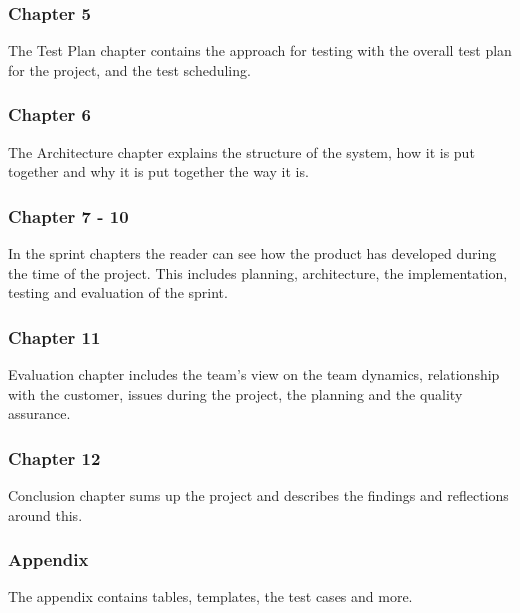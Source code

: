 \subsubsection{Chapter 5}
The Test Plan chapter contains the approach for testing with the overall test plan for the project, and the test scheduling.
\subsubsection{Chapter 6}
The Architecture chapter explains the structure of the system, how it is put together and why it is put together the way it is.
\subsubsection{Chapter 7 - 10}
In the sprint chapters the reader can see how the product has developed during the time of the project. This includes planning, architecture, the implementation, testing and evaluation of the sprint.
\subsubsection{Chapter 11}
Evaluation chapter includes the team's view on the team dynamics, relationship with the customer, issues during the project, the planning and the quality assurance.  
\subsubsection{Chapter 12}
Conclusion chapter sums up the project and describes the findings and reflections around this.
\subsubsection{Appendix}
The appendix contains tables, templates, the test cases and more.

